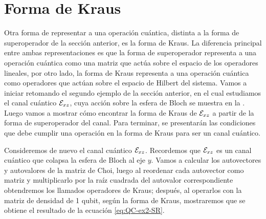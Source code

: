 \section{Forma de Kraus} %
 

Otra forma de representar a una operación cuántica, distinta a la
forma de superoperador de la sección anterior, es la forma de Kraus. 
La diferencia principal entre ambas representaciones 
es que la forma de superoperador
representa a una operación cuántica como una matriz que 
actúa sobre el espacio de los operadores lineales, por otro lado,
la forma de Kraus representa a una operación cuántica 
como operadores que actúan sobre el espacio de 
Hilbert del sistema. Vamos a iniciar retomando el segundo 
ejemplo de la sección anterior, en el cual estudiamos 
el canal cuántico $\mathcal{E}_{xz}$, cuya acción sobre la esfera
de Bloch se muestra en la .
Luego vamos a mostrar cómo encontrar la forma de Kraus de $\mathcal{E}_{xz}$ 
a partir de la forma de superoperador del canal.
Para terminar, se presentarán las condiciones 
que debe cumplir una operación en la forma de Kraus para
ser un canal cuántico.

Consideremos de nuevo el canal cuántico $\mathcal{E}_{xz}$.
Recordemos que $\mathcal{E}_{xz}$ es un canal cuántico
que colapsa la esfera de Bloch al eje $y$. 
Vamos a calcular los autovectores y autovalores de la 
matriz de Choi, luego al reordenar
cada autovector como matriz y multiplicarlo por la raíz cuadrada
del autovalor correspondiente obtendremos los llamados 
operadores de Kraus; después, al operarlos con la matriz 
de densidad de 1 qubit, según 
la forma de Kraus, mostraremos que se obtiene el 
resultado de la ecuación \eqref{eq:QC-ex2-SR}.

